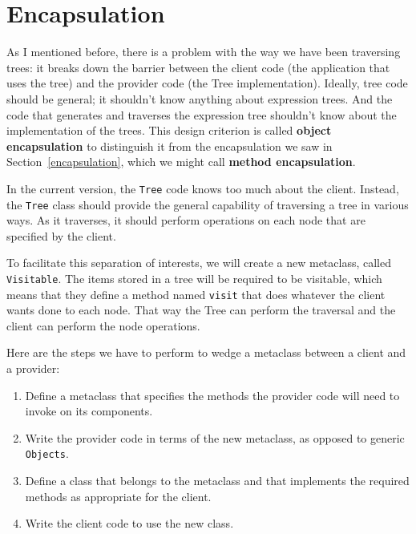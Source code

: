 \section {Encapsulation}

As I mentioned before, there is a problem with the way we have been
traversing trees: it breaks down the barrier between the client code
(the application that uses the tree) and the provider code (the Tree
implementation).  Ideally, tree code should be general; it shouldn't
know anything about expression trees.  And the code that generates and
traverses the expression tree shouldn't know about the implementation
of the trees.  This design criterion is called {\bf object
encapsulation} to distinguish it from the encapsulation we saw in
Section~\ref{encapsulation}, which we might call {\bf method
encapsulation}.

In the current version, the {\tt Tree} code knows too much about
the client.  Instead, the {\tt Tree} class should provide
the general capability of traversing a tree in various ways.  As
it traverses, it should perform operations on each node that are
specified by the client.



To facilitate this separation of interests, we will
create a new metaclass, called {\tt Visitable}.  The items
stored in a tree will be required to be visitable, which means
that they define a method named {\tt visit} that does whatever
the client wants done to each node.  That way the
Tree can perform the traversal and the client can perform
the node operations.

Here are the steps we have to perform to wedge a metaclass
between a client and a provider:

\begin{enumerate}

\item Define a metaclass that specifies the methods
the provider code will need to invoke on its components.

\item Write the provider code in terms of the new metaclass,
as opposed to generic {\tt Objects}.

\item Define a class that belongs to the metaclass
and that implements the required methods 
as appropriate for the client.

\item Write the client code to use the new class.

\end{enumerate}

